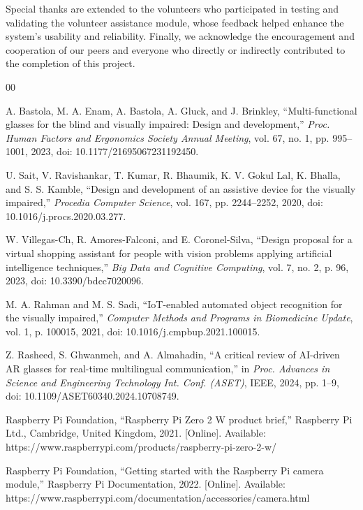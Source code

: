 \documentclass[conference]{IEEEtran}
\begin{document}
Special thanks are extended to the volunteers who participated in testing and validating the volunteer assistance module, whose feedback helped enhance the system's usability and reliability. Finally, we acknowledge the encouragement and cooperation of our peers and everyone who directly or indirectly contributed to the completion of this project.

\begin{thebibliography}{00}

A. Bastola, M. A. Enam, A. Bastola, A. Gluck, and J. Brinkley, 
``Multi-functional glasses for the blind and visually impaired: Design and development,'' 
\emph{Proc. Human Factors and Ergonomics Society Annual Meeting}, 
vol. 67, no. 1, pp. 995--1001, 2023, doi: 10.1177/21695067231192450.

U. Sait, V. Ravishankar, T. Kumar, R. Bhaumik, K. V. Gokul Lal, 
K. Bhalla, and S. S. Kamble, 
``Design and development of an assistive device for the visually impaired,'' 
\emph{Procedia Computer Science}, vol. 167, pp. 2244--2252, 2020, 
doi: 10.1016/j.procs.2020.03.277.

W. Villegas-Ch, R. Amores-Falconi, and E. Coronel-Silva, 
``Design proposal for a virtual shopping assistant for people with vision problems applying artificial intelligence techniques,'' 
\emph{Big Data and Cognitive Computing}, vol. 7, no. 2, p. 96, 2023, 
doi: 10.3390/bdcc7020096.

M. A. Rahman and M. S. Sadi, 
``IoT-enabled automated object recognition for the visually impaired,'' 
\emph{Computer Methods and Programs in Biomedicine Update}, 
vol. 1, p. 100015, 2021, 
doi: 10.1016/j.cmpbup.2021.100015.

Z. Rasheed, S. Ghwanmeh, and A. Almahadin, 
``A critical review of AI-driven AR glasses for real-time multilingual communication,'' 
in \emph{Proc. Advances in Science and Engineering Technology Int. Conf. (ASET)}, 
IEEE, 2024, pp. 1--9, 
doi: 10.1109/ASET60340.2024.10708749.

Raspberry Pi Foundation,
``Raspberry Pi Zero 2 W product brief,''
Raspberry Pi Ltd., Cambridge, United Kingdom, 2021.
[Online]. Available: https://www.raspberrypi.com/products/raspberry-pi-zero-2-w/

Raspberry Pi Foundation,
``Getting started with the Raspberry Pi camera module,''
Raspberry Pi Documentation, 2022.
[Online]. Available: https://www.raspberrypi.com/documentation/accessories/camera.html



\end{thebibliography}
\end{document}
